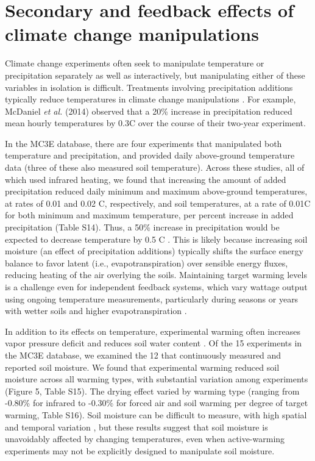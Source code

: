 \documentclass{article}
\begin{document}
\section* {Secondary and feedback effects of climate change manipulations} 
Climate change experiments often seek to manipulate temperature or precipitation separately as well as interactively, but manipulating either of these variables in isolation is difficult. Treatments involving precipitation additions typically reduce temperatures in climate change manipulations \citep{sherry2007,rollinson2012,mcdaniel2014}. For example, McDaniel \emph{et al.} (2014) observed that a 20\% increase in precipitation reduced mean hourly temperatures by 0.3\degree C over the course of their two-year experiment. 
\par In the MC3E database, there are four experiments that manipulated both temperature and precipitation, and provided daily above-ground temperature data (three of these also measured soil temperature). Across these studies, all of which used infrared heating, we found that increasing the amount of added precipitation reduced daily minimum and maximum above-ground temperatures, at rates of 0.01 and 0.02 \degree C, respectively, and soil temperatures, at a rate of 0.01\degree C for both minimum and maximum temperature, per percent increase in added precipitation (Table S14). Thus, a 50\% increase in precipitation would be expected to decrease temperature by 0.5 \degree C .
This is likely because increasing soil moisture (an effect of precipitation additions) typically shifts the surface energy balance to favor latent (i.e., evapotranspiration) over sensible energy fluxes, reducing heating of the air overlying the soils. Maintaining target warming levels is a challenge even for independent feedback systems, which vary wattage output using ongoing temperature measurements, particularly during seasons or years with wetter soils and higher evapotranspiration \citep{rich2015}.
\par In addition to its effects on temperature, experimental warming often increases vapor pressure deficit and reduces soil water content \citep[e.g.,][]{harte1995b,sherry2007,morin2010,pelini2014,templer2016}. Of the 15 experiments in the MC3E database, we examined the 12 that continuously measured and reported soil moisture. We found that experimental warming reduced soil moisture across all warming types, with substantial variation among experiments (Figure 5, Table S15). The drying effect varied by warming type (ranging from -0.80\% for infrared to -0.30\% for forced air and soil warming per degree of target warming, Table S16). Soil moisture can be difficult to measure, with high spatial and temporal variation \citep{famiglietti1999,teuling2005}, but these results suggest that soil moisture is unavoidably affected by changing temperatures, even when active-warming experiments may not be explicitly designed to manipulate soil moisture.
\end{document}
